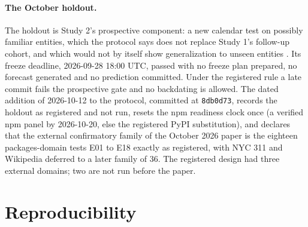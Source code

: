 \documentclass[10pt]{article}
\begin{document}
\paragraph{The October holdout.} The holdout is Study 2's prospective component: a new calendar test on
possibly familiar entities, which the protocol says does not replace Study 1's follow-up cohort, and which
would not by itself show generalization to unseen entities \citep{moghadasi2026}. Its freeze deadline,
2026-09-28 18:00 UTC, passed with no freeze plan prepared, no forecast generated and no prediction committed.
Under the registered rule a late commit fails the prospective gate and no backdating is allowed. The dated
addition of 2026-10-12 to the protocol, committed at \texttt{8db0d73}, records the holdout as registered and
not run, resets the npm readiness clock once (a verified npm panel by 2026-10-20, else the registered PyPI
substitution), and declares that the external confirmatory family of the October 2026 paper is the eighteen
packages-domain tests E01 to E18 exactly as registered, with NYC 311 and Wikipedia deferred to a later family
of 36. The registered design had three external domains; two are not run before the paper.

\section{Reproducibility}








\appendix








\end{document}
